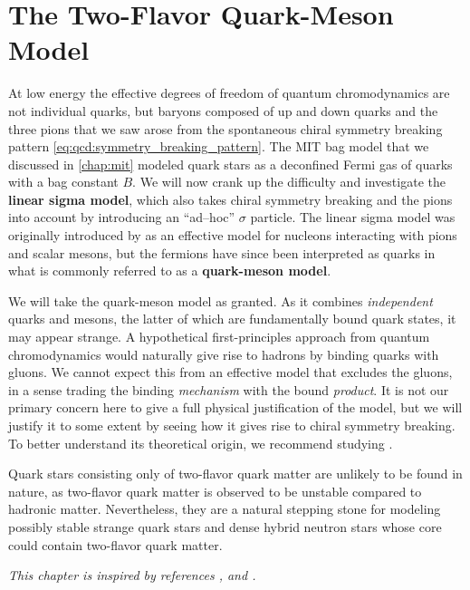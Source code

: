 \chapter{The Two-Flavor Quark-Meson Model}
\label{chap:lsm2f}

At low energy the effective degrees of freedom of quantum chromodynamics are not individual quarks,
but baryons composed of up and down quarks and the three pions that we saw arose from the spontaneous chiral symmetry breaking pattern \eqref{eq:qcd:symmetry_breaking_pattern}.
The MIT bag model that we discussed in \cref{chap:mit} modeled quark stars as a deconfined Fermi gas of quarks with a bag constant $B$.
We will now crank up the difficulty and investigate the \textbf{linear sigma model}, which also takes chiral symmetry breaking and the pions into account by introducing an ``ad--hoc'' $\sigma$ particle.
The linear sigma model was originally introduced by \cite{ref:lsm_original} as an effective model for nucleons interacting with pions and scalar mesons,
but the fermions have since been interpreted as quarks in what is commonly referred to as a \textbf{quark-meson model}.

We will take the quark-meson model as granted.
As it combines \emph{independent} quarks and mesons,
the latter of which are fundamentally bound quark states,
it may appear strange.
A hypothetical first-principles approach from quantum chromodynamics
would naturally give rise to hadrons by binding quarks with gluons.
We cannot expect this from an effective model that excludes the gluons,
in a sense trading the binding \emph{mechanism} with the bound \emph{product}.
It is not our primary concern here to give a full physical justification of the model,
but we will justify it to some extent by seeing how it gives rise to chiral symmetry breaking.
To better understand its theoretical origin, we recommend studying \cite{ref:master_resch,ref:master_folkestad,ref:lsm_notes}.

Quark stars consisting only of two-flavor quark matter are unlikely to be found in nature,
as two-flavor quark matter is observed to be unstable compared to hadronic matter.
Nevertheless, they are a natural stepping stone for modeling possibly stable strange quark stars
and dense hybrid neutron stars whose core could contain two-flavor quark matter.

\textit{This chapter is inspired by references \cite{ref:lsm_2f}, \cite{ref:lsm_notes} and \cite{ref:jo_lsm_consistent_physical}.}

